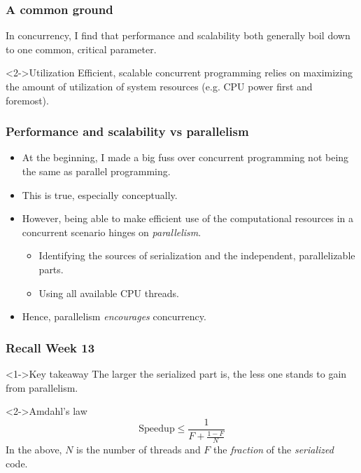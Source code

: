 \documentclass[xcolor={dvipsnames,svgnames},aspectratio=169]{beamer}
\begin{document}
\begin{frame}[fragile]
  \frametitle{A common ground}

  In concurrency, I find that performance and scalability both generally boil down to one
  common, critical parameter.

  \vspace{0.6cm}

  \begin{block}<2->{\faLightbulb \quad Utilization}
    Efficient, scalable concurrent programming relies on maximizing the amount
    of utilization of system resources (e.g. CPU power first and foremost).
  \end{block}
\end{frame}

\begin{frame}[fragile]
  \frametitle{Performance and scalability vs parallelism}
\begin{itemize}
\item[\faBook]<1-> At the beginning, I made a big fuss over concurrent
  programming  not being the same as parallel programming.
\item[\faBook]<2-> This is true, especially conceptually.
\item[\faBook]<3-> However, being able to make efficient use of the
  computational resources in a concurrent scenario hinges on
  \emph{parallelism}.
  \begin{itemize}
  \item[\faBook]<3-> Identifying the sources of serialization and the
    independent, parallelizable parts.
  \item[\faBook]<3-> Using all available CPU threads.
  \end{itemize}
\item[\faBook]<4-> Hence, parallelism \emph{encourages} concurrency.
\end{itemize}

\end{frame}

\begin{frame}[fragile]
  \frametitle{Recall Week 13}

  \begin{block}<1->{\faLightbulb \quad Key takeaway}
    The larger the serialized part is, the less one stands to gain from parallelism.
  \end{block}

  \vspace{0.6cm}

  \begin{block}<2->{\faLightbulb \quad Amdahl's law}
    \[
      \mathrm{Speedup} \leq \frac{1}{F + \frac{1-F}{N}}
    \]
    In the above, $N$ is the number of threads and $F$ the \emph{fraction} of
    the \emph{serialized} code.
  \end{block}
\end{frame}
\end{document}
